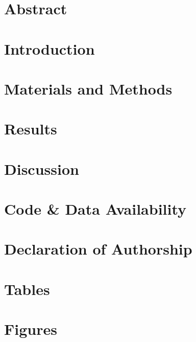 \documentclass[12pt, oneside]{report}
\begin{document}


\chapter*{Abstract}


\tableofcontents
\listoffigures
\listoftables
\chapter{Introduction}
\label{chapter01}


\chapter{Materials and Methods}
\label{chapter02}


\chapter{Results}
\label{chapter03}


\chapter{Discussion}
\label{discussion}


\chapter*{Code \& Data Availability}

\chapter*{Declaration of Authorship}


\appendix
\chapter{Tables}

\chapter{Figures}


\printbibliography
\end{document}
